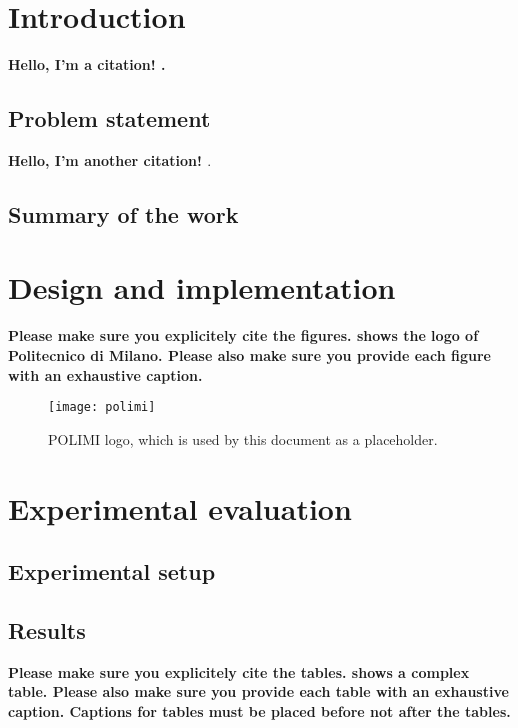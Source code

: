 \section{Introduction}
\textbf{Hello, I'm a citation! \cite{mathes1976designing}.}
\lipsum[2]
\subsection{Problem statement}
\textbf{Hello, I'm another citation! \cite{miller1979humanistic}}.
\lipsum[1-2]
\subsection{Summary of the work}
\lipsum[2]

\pagebreak

\section{Design and implementation}
\textbf{Please make sure you explicitely cite the figures.
 shows the logo of Politecnico di Milano.
Please also make sure you provide each figure with an exhaustive caption.}

\lipsum[1-12]

\begin{figure}
\centering\texttt{[image: polimi]}
\caption{POLIMI logo, which is used by this document as a placeholder.}
\label{fig:polimi_logo}
\end{figure}

\section{Experimental evaluation}
\lipsum[1]
\subsection{Experimental setup}
\lipsum[1-2]
\subsection{Results}
\textbf{Please make sure you explicitely cite the tables.
 shows a complex table.
Please also make sure you provide each table with an exhaustive caption.
Captions for tables must be placed before not after the tables.}
\lipsum[1-4]


